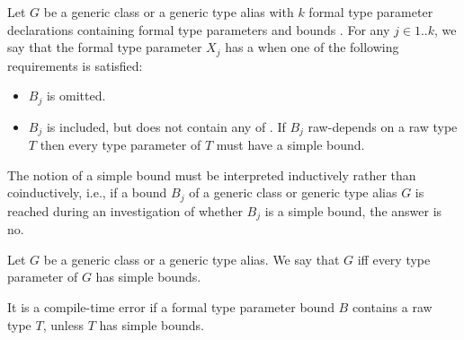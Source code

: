 \documentclass[makeidx]{article}
\begin{document}
\LMHash{}%
Let $G$ be a generic class or a generic type alias
with $k$ formal type parameter declarations
containing formal type parameters  and bounds .
For any $j \in 1 .. k$,
we say that the formal type parameter $X_j$ has a 
when one of the following requirements is satisfied:

\begin{itemize}
\item $B_j$ is omitted.

\item $B_j$ is included, but does not contain any of .
  If $B_j$ raw-depends on a raw type $T$
  then every type parameter of $T$ must have a simple bound.
\end{itemize}

\LMHash{}%
The notion of a simple bound must be interpreted inductively rather than
coinductively, i.e., if a bound $B_j$ of a generic class or
generic type alias $G$ is reached during an investigation of whether
$B_j$ is a simple bound, the answer is no.


\LMHash{}%
Let $G$ be a generic class or a generic type alias.
We say that $G$
if{}f every type parameter of $G$ has simple bounds.


\LMHash{}%
It is a compile-time error
if a formal type parameter bound $B$ contains a raw type $T$,
unless $T$ has simple bounds.

\end{document}
